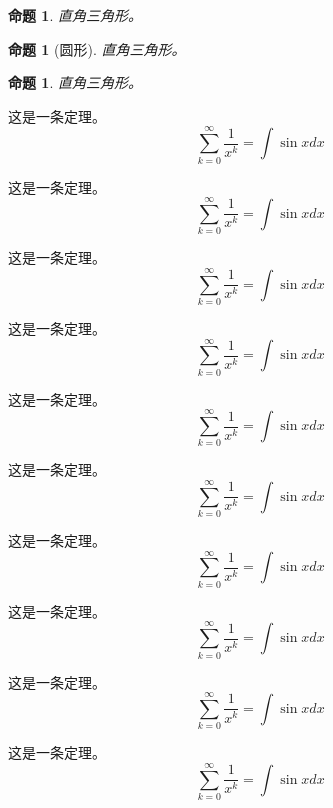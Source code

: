 \documentclass[twoside]{fduthesis}
\begin{document}
\newtheorem{prop}[thm]{命题}[chapter]

\begin{prop}
  直角三角形。
\end{prop}
\begin{prop}[圆形]
  直角三角形。
\end{prop}
\begin{prop}
  直角三角形。
\end{prop}

\begin{p}
这是一条定理。
\[ \sum_{k=0}^{\infty} \frac{1}{x^k} = \int \sin x dx \]
\end{p}

\begin{mm}[明早]
这是一条定理。
\[ \sum_{k=0}^{\infty} \frac{1}{x^k} = \int \sin x dx \]
\end{mm}

\begin{fduc}
这是一条定理。
\[ \sum_{k=0}^{\infty} \frac{1}{x^k} = \int \sin x dx \]
\end{fduc}

\begin{fdub}
这是一条定理。
\[ \sum_{k=0}^{\infty} \frac{1}{x^k} = \int \sin x dx \]
\end{fdub}

\begin{mb}
这是一条定理。
\[ \sum_{k=0}^{\infty} \frac{1}{x^k} = \int \sin x dx \]
\end{mb}

\begin{cb}
这是一条定理。
\[ \sum_{k=0}^{\infty} \frac{1}{x^k} = \int \sin x dx \]
\end{cb}


\begin{np}
这是一条定理。
\[ \sum_{k=0}^{\infty} \frac{1}{x^k} = \int \sin x dx \]
\end{np}

\begin{nmm}[明天一早]
这是一条定理。
\[ \sum_{k=0}^{\infty} \frac{1}{x^k} = \int \sin x dx \]
\end{nmm}

\begin{nfduc}
这是一条定理。
\[ \sum_{k=0}^{\infty} \frac{1}{x^k} = \int \sin x dx \]
\end{nfduc}

\begin{nfdub}
这是一条定理。
\[ \sum_{k=0}^{\infty} \frac{1}{x^k} = \int \sin x dx \]
\end{nfdub}
\end{document}
